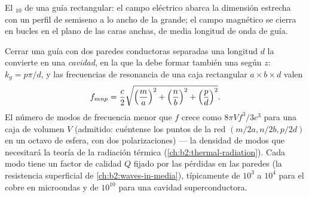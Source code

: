 \begin{omfigure}

{\small El $_{10}$ de una guía rectangular: el campo eléctrico
abarca la dimensión estrecha con un perfil de semiseno a lo ancho de la
grande; el campo magnético se cierra en bucles en el plano de las caras
anchas, de media longitud de onda de guía.}
\end{omfigure}

\begin{proposition}\label{prop:b2:guided-waves:cavity}
Cerrar una guía con dos paredes conductoras separadas una longitud $d$ la convierte
en una \emph{cavidad}, en la que la  debe formar también una  según $z$: $k_g = p\pi/d$, y las frecuencias de resonancia de una
caja rectangular $a \times b \times d$ valen
\[
f_{mnp} = \frac c2\sqrt{\Bigl(\frac ma\Bigr)^2 + \Bigl(\frac nb\Bigr)^2 + \Bigl(\frac pd\Bigr)^2} .
\]
El número de modos de frecuencia menor que $f$ crece como $8\pi V f^3/3c^3$ para
una caja de volumen $V$ (admitido: cuéntense los puntos de la red
$(m/2a, n/2b, p/2d)$ en un octavo de esfera, con dos polarizaciones)
--- la densidad de modos que necesitará la teoría de la radiación
térmica (\cref{ch:b2:thermal-radiation}). Cada modo tiene un factor de calidad
$Q$ fijado por las pérdidas en las paredes (la resistencia superficial de
\cref{ch:b2:waves-in-media}), típicamente de $10^3$ a $10^4$ para el cobre en
microondas y de $10^{10}$ para una cavidad superconductora.
\end{proposition}

